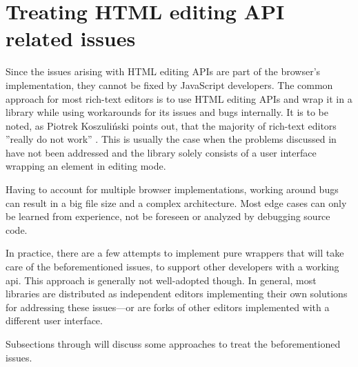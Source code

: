 
\section{Treating HTML editing API related issues}
\label{sec:ed_api_treating}

Since the issues arising with HTML editing APIs are part of the browser's implementation, they cannot be fixed by JavaScript developers. The common approach for most rich-text editors is to use HTML editing APIs and wrap it in a library while using workarounds for its issues and bugs internally. It is to be noted, as Piotrek Koszuli\'{n}ski points out, that the majority of rich-text editors ''really do not work'' \cite{bj}. This is usually the case when the problems discussed in  have not been addressed and the library solely consists of a user interface wrapping an element in editing mode.


Having to account for multiple browser implementations, working around bugs can result in a big file size and a complex architecture. Most edge cases can only be learned from experience, not be foreseen or analyzed by debugging source code. %

In practice, there are a few attempts to implement pure wrappers that will take care of the beforementioned issues, to support other developers with a working api. This approach is generally not well-adopted though. In general, most libraries are distributed as independent editors implementing their own solutions for addressing these issues---or are forks of other editors implemented with a different user interface.

Subsections  through  will discuss some approaches to treat the beforementioned issues.






